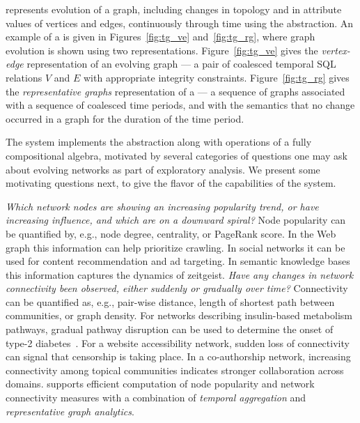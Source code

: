 \ql represents evolution of a graph, including changes in topology and
in attribute values of vertices and edges, continuously through time
using the \tg abstraction.  An example of a \tg is given in
Figures~\ref{fig:tg_ve} and~\ref{fig:tg_rg}, where graph evolution is
shown using two representations.  Figure~\ref{fig:tg_ve} gives the
{\em vertex-edge} representation of an evolving graph --- a pair of
coalesced temporal SQL relations $V$ and $E$ with appropriate
integrity constraints.  Figure~\ref{fig:tg_rg} gives the {\em
  representative graphs} representation of a \tg --- a sequence of
graphs associated with a sequence of coalesced time periods, and with
the semantics that no change occurred in a graph for the duration of
the time period.


The \ql system implements the \tg abstraction along with operations of
a fully compositional \tg algebra, motivated by several categories of
questions one may ask about evolving networks as part of exploratory
analysis.  We present some motivating questions next, to give the
flavor of the capabilities of the \ql system.

{\em Which network nodes are showing an increasing popularity trend,
  or have increasing influence, and which are on a downward spiral?}
Node popularity can be quantified by, e.g., node degree, centrality,
or PageRank score.  In the Web graph this information can help
prioritize crawling.  In social networks it can be used for content
recommendation and ad targeting.  In semantic knowledge bases this
information captures the dynamics of zeitgeist.
%
{\em Have any changes in network connectivity been observed, either
  suddenly or gradually over time?} Connectivity can be quantified as,
e.g., pair-wise distance, length of shortest path between communities,
or graph density.  For networks describing insulin-based metabolism
pathways, gradual pathway disruption can be used to determine the
onset of type-2 diabetes~\cite{DBLP:journals/tcsb/BeyerTLSF10}.  For a
website accessibility network, sudden loss of connectivity can signal
that censorship is taking place. In a co-authorship network,
increasing connectivity among topical communities indicates stronger
collaboration across domains.
%
\ql supports efficient computation of node popularity and network
connectivity measures with a combination of {\em temporal aggregation}
and {\em representative graph analytics}.

